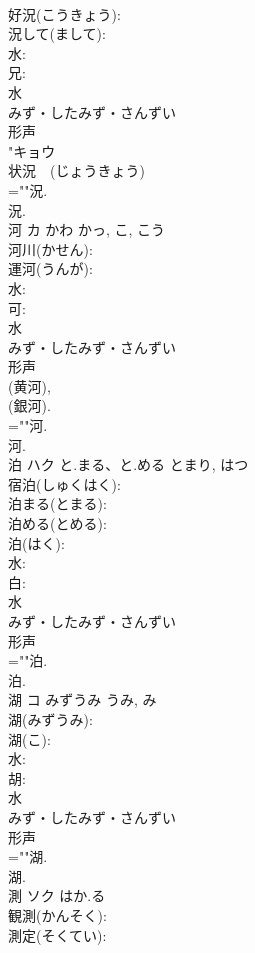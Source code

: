 \documentclass[8pt]{extreport}
\begin{document}
\begin{CJK}{UTF8}{min}
\\	好況(こうきょう): 
\\	況して(まして): 
\\	水: 
\\	兄: 
\\	水	
\\	みず・したみず・さんずい	
\\	形声 
\\	"キョウ 
\\	状況　(じょうきょう)　
\\	=""況.
\\	況.
\\	河	カ	かわ	かっ, こ, こう	
\\	河川(かせん): 
\\	運河(うんが): 
\\	水: 
\\	可: 
\\	水	
\\	みず・したみず・さんずい	
\\	形声 
\\	(黄河), 
\\	(銀河). 
\\	=""河.
\\	河.
\\	泊	ハク	と.まる、と.める	とまり, はつ	
\\	宿泊(しゅくはく): 
\\	泊まる(とまる): 
\\	泊める(とめる): 
\\	泊(はく): 
\\	水: 
\\	白: 
\\	水	
\\	みず・したみず・さんずい	
\\	形声 
\\	=""泊.
\\	泊.
\\	湖	コ	みずうみ	うみ, み	
\\	湖(みずうみ): 
\\	湖(こ): 
\\	水: 
\\	胡: 
\\	水	
\\	みず・したみず・さんずい	
\\	形声 
\\	=""湖.
\\	湖.
\\	測	ソク	はか.る		
\\	観測(かんそく): 
\\	測定(そくてい): 

\end{CJK}
\end{document}
